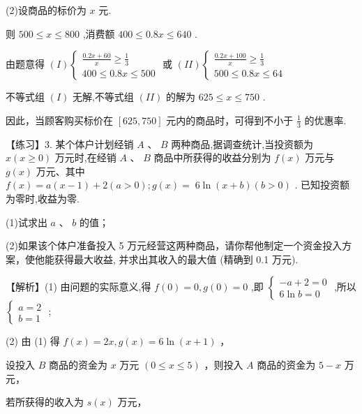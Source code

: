\documentclass[10pt]{article}
\begin{document}
(2)设商品的标价为 \(x\) 元.

则 \({500} \leq  x \leq  {800}\) ,消费额 \({400} \leq  {0.8x} \leq  {640}\) .

由题意得 \(\left( I\right) \left\{  \begin{array}{l} \frac{{0.2x} + {60}}{x} \geq  \frac{1}{3} \\  {400} \leq  {0.8x} \leq  {500} \end{array}\right.\) 或 \(\left( {II}\right) \left\{  \begin{array}{l} \frac{{0.2x} + {100}}{x} \geq  \frac{1}{3} \\  {500} \leq  {0.8x} \leq  {64} \end{array}\right.\)

不等式组 \(\left( I\right)\) 无解,不等式组 \(\left( {II}\right)\) 的解为 \({625} \leq  x \leq  {750}\) .

因此，当顾客购买标价在 \(\left\lbrack  {{625},{750}}\right\rbrack\) 元内的商品时，可得到不小于 \(\frac{1}{3}\) 的优惠率.

【练习】3. 某个体户计划经销 \(A\text{ 、 }B\) 两种商品,据调查统计,当投资额为 \(x\left( {x \geq  0}\right)\) 万元时,在经销 \(A\text{ 、 }B\) 商品中所获得的收益分别为 \(f\left( x\right)\) 万元与 \(g\left( x\right)\) 万元、其中 \(f\left( x\right)  = a\left( {x - 1}\right)  + 2\left( {a > 0}\right) ;g\left( x\right)  = \; 6\ln \left( {x + b}\right) \left( {b > 0}\right)\) . 已知投资额为零时,收益为零.

(1)试求出 \(a\text{ 、 }b\) 的值；

(2)如果该个体户准备投入 5 万元经营这两种商品，请你帮他制定一个资金投入方案，使他能获得最大收益, 并求出其收入的最大值 (精确到 0.1 万元).

【解析】(1) 由问题的实际意义,得 \(f\left( 0\right)  = 0,g\left( 0\right)  = 0\) ,即 \(\left\{  \begin{array}{l}  - a + 2 = 0 \\  6\ln b = 0 \end{array}\right.\) ,所以 \(\left\{  \begin{array}{l} a = 2 \\  b = 1 \end{array}\right.\) ;

(2) 由 (1) 得 \(f\left( x\right)  = {2x},g\left( x\right)  = 6\ln \left( {x + 1}\right)\) ，

设投入 \(B\) 商品的资金为 \(x\) 万元 \(\left( {0 \leq  x \leq  5}\right)\) ，则投入 \(A\) 商品的资金为 \(5 - x\) 万元，

若所获得的收入为 \(s\left( x\right)\) 万元，
\end{document}
